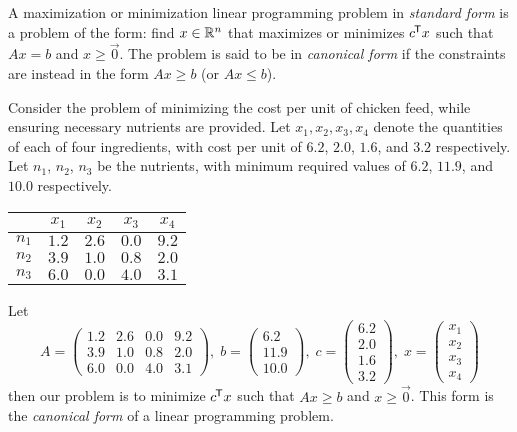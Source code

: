 \begin{defn}
    A maximization or minimization linear programming problem in \emph{standard form} is a problem of the form:
    find $x \in \mathbb{R}^n$ that maximizes or minimizes ${c}^{\mkern-1.5mu\mathsf{T}}x$ such that $Ax = b$ and $x \geq \vec{0}$. The problem is said to be in \emph{canonical form} if the constraints are instead in the form $Ax \geq b$ (or $Ax \leq b$).
\end{defn}

\begin{exmp}
    Consider the problem of minimizing the cost per unit of chicken feed, while ensuring necessary nutrients are provided. Let $x_1, x_2, x_3, x_4$ denote the quantities of each of four ingredients, with cost per unit of $6.2$, $2.0$, $1.6$, and $3.2$ respectively. Let $n_1$, $n_2$, $n_3$ be the nutrients, with minimum required values of $6.2$, $11.9$, and $10.0$ respectively.

    \begin{minipage}{\linewidth}
        \begin{center}
        \label{exmp-feed-nutrition-values}
        \begin{tabular}{c|cccc}
        & $x_1$ & $x_2$ & $x_3$ & $x_4$\\
        \hline
        $n_1$ & $1.2$ & $2.6$ & $0.0$ & $9.2$ \\ \hline
        $n_2$ & $3.9$ & $1.0$ & $0.8$ & $2.0$ \\ \hline
        $n_3$ & $6.0$ & $0.0$ & $4.0$ & $3.1$ \\
        \end{tabular}
        \end{center}
    \end{minipage}

    Let
    \[A = \begin{pmatrix}
        1.2 & 2.6 & 0.0 & 9.2 \\
        3.9 & 1.0 & 0.8 & 2.0 \\
        6.0 & 0.0 & 4.0 & 3.1
    \end{pmatrix},\; b = \begin{pmatrix}
        6.2 \\ 11.9 \\ 10.0
    \end{pmatrix},\; c = \begin{pmatrix}
        6.2 \\ 2.0 \\ 1.6 \\ 3.2
    \end{pmatrix},\; x = \begin{pmatrix}
        x_1 \\ x_2 \\ x_3 \\ x_4
    \end{pmatrix}\]
    then our problem is to minimize ${c}^{\mkern-1.5mu\mathsf{T}}x$ such that $Ax \geq b$ and $x \geq \vec{0}$. This form is the \emph{canonical form} of a linear programming problem.
\end{exmp}

